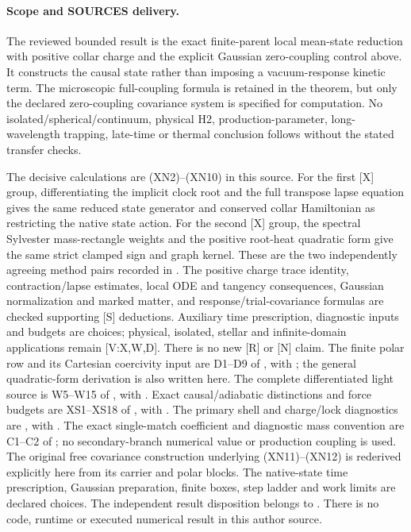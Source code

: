 \documentclass[11pt]{article}
\begin{document}
\paragraph{Scope and SOURCES delivery.}
The reviewed bounded result is the exact finite-parent local
mean-state reduction with positive
collar charge and the explicit Gaussian zero-coupling control
above.  It constructs the causal state rather than imposing a
vacuum-response kinetic term.  The microscopic full-coupling
formula is retained in the theorem, but only the declared
zero-coupling covariance system is specified for computation.
No isolated/spherical/continuum, physical H2, production-parameter,
long-wavelength trapping, late-time or thermal conclusion follows
without the stated transfer checks.

The decisive calculations are (XN2)--(XN10) in this source.
For the first [X] group, differentiating the implicit clock root
and the full transpose lapse equation gives the same reduced
state generator and conserved collar Hamiltonian as restricting
the native state action.  For the second [X] group, the
spectral Sylvester mass-rectangle weights and the positive
root-heat quadratic form give the same strict clamped sign
and graph kernel.  These are the two independently agreeing
method pairs recorded in
.
The positive charge trace identity, contraction/lapse estimates,
local ODE and tangency consequences, Gaussian normalization and
marked matter, and response/trial-covariance formulas are checked
supporting [S] deductions.  Auxiliary time prescription, diagnostic
inputs and budgets are choices; physical, isolated, stellar and
infinite-domain applications remain [V:X,W,D].  There is no
new [R] or [N] claim.
The finite polar row and its Cartesian coercivity input are
D1--D9 of , with
; the general quadratic-form derivation
is also written here.  The complete differentiated light source
is W5--W15 of , with
.  Exact causal/adiabatic distinctions
and force budgets are XS1--XS18 of
, with
.
The primary shell and charge/lock diagnostics are
, with .
The exact single-match coefficient and diagnostic mass convention
are C1--C2 of ; no secondary-branch
numerical value or production coupling is used.
The original free covariance construction underlying (XN11)--(XN12)
is rederived explicitly here from its carrier and polar blocks.
The native-state time prescription, Gaussian preparation, finite
boxes, step ladder and work limits are declared choices.
The independent result disposition belongs to
.  There is no code,
runtime or executed numerical result in this author source.
\end{document}
